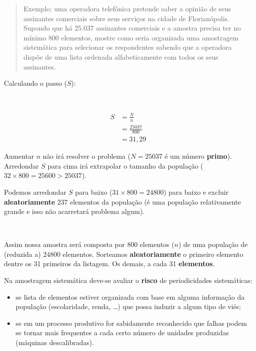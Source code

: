 \documentclass[
]{book}
\providecommand{\tightlist}{%
  \setlength{\itemsep}{0pt}\setlength{\parskip}{0pt}}
\begin{document}
\hfill\break

\begin{quote}
Exemplo: uma operadora telefônica pretende saber a opinião de seus assinantes comerciais sobre seus serviços na cidade de Florianópolis. Supondo que há 25.037 assinantes comerciais e a amostra precisa ter no mínimo 800 elementos, mostre como seria organizada uma amostragem sistemática para selecionar os respondentes sabendo que a operadora dispõe de uma lista ordenada alfabeticamente com todos os seus assinantes.
\end{quote}

\hfill\break

Calculando o passo (\(S\)):

~

\begin{align*}
S & = \frac{N}{n} \\
  & = \frac{25037}{800} \\
  & = 31,29
\end{align*}

\hfill\break

Aumentar \(n\) não irá resolver o problema (\(N=25037\) é um número \textbf{primo}). Arredondar \(S\) para cima irá extrapolar o tamanho da população (\(32 \times 800=25600 >25037\)).

\hfill\break

Podemos arredondar \(S\) para baixo (\(31 \times 800=24800\)) para baixo e excluir \textbf{aleatoriamente} 237 elementos da população (é uma população relativamente grande e isso não acarretará problema algum).

~

Assim nossa amostra será composta por 800 elementos (\(n\)) de uma população de (reduzida a) \(24800\) elementos. Sorteamos \textbf{aleatoriamente} o primeiro elemento dentre os 31 primeiros da listagem. Os demais, a cada 31 \textbf{elementos}.

\hfill\break

Na amostragem sistemática deve-se avaliar o \textbf{risco} de periodicidades sistemáticas:

\hfill\break

\begin{itemize}
\tightlist
\item
  se lista de elementos estiver organizada com base em alguma informação da população (escolaridade, renda, \ldots) que possa induzir a algum tipo de viés;\\
\item
  se em um processo produtivo for sabidamente reconhecido que falhas podem se tornar mais frequentes a cada certo número de unidades produzidas (máquinas descalibradas).
\end{itemize}
\end{document}
